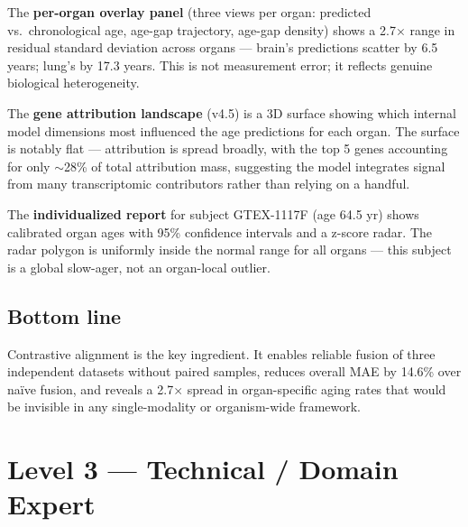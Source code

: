 \documentclass[11pt]{article}
\begin{document}
\begin{tcolorbox}[L2box]
The \textbf{per-organ overlay panel} (three views per organ: predicted vs.\ chronological age, age-gap trajectory, age-gap density) shows a 2.7$\times$ range in residual standard deviation across organs --- brain's predictions scatter by 6.5 years; lung's by 17.3 years. This is not measurement error; it reflects genuine biological heterogeneity.

The \textbf{gene attribution landscape} (v4.5) is a 3D surface showing which internal model dimensions most influenced the age predictions for each organ. The surface is notably flat --- attribution is spread broadly, with the top 5 genes accounting for only $\sim$28\% of total attribution mass, suggesting the model integrates signal from many transcriptomic contributors rather than relying on a handful.

The \textbf{individualized report} for subject GTEX-1117F (age 64.5 yr) shows calibrated organ ages with 95\% confidence intervals and a z-score radar. The radar polygon is uniformly inside the normal range for all organs --- this subject is a global slow-ager, not an organ-local outlier.

\subsection{Bottom line}

Contrastive alignment is the key ingredient. It enables reliable fusion of three independent datasets without paired samples, reduces overall MAE by 14.6\% over naïve fusion, and reveals a 2.7$\times$ spread in organ-specific aging rates that would be invisible in any single-modality or organism-wide framework.

\end{tcolorbox}

\newpage

\section{\textcolor{L3color}{Level 3 \textnormal{---} Technical / Domain Expert}}
\end{document}
